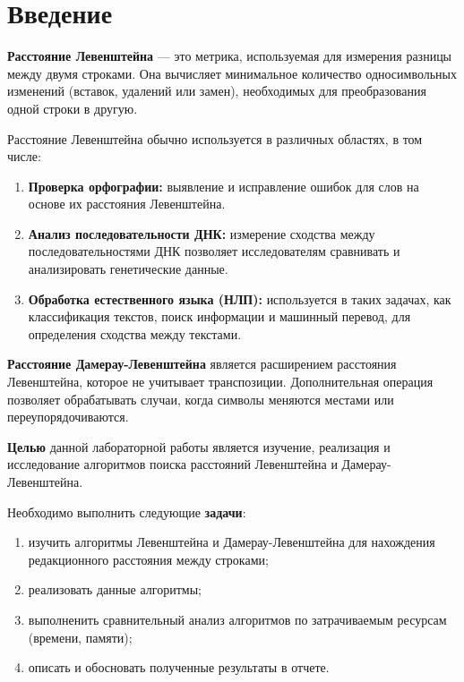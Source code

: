 \chapter*{Введение}

\textbf{Расстояние Левенштейна} — это метрика, используемая для измерения разницы между двумя строками. Она вычисляет минимальное количество односимвольных изменений (вставок, удалений или замен), необходимых для преобразования одной строки в другую.

Расстояние Левенштейна обычно используется в различных областях, в том числе:
\begin{enumerate}
    \item \textbf{Проверка орфографии:} выявление и исправление ошибок для слов на основе их расстояния Левенштейна.
    \item \textbf{Анализ последовательности ДНК:} измерение сходства между последовательностями ДНК позволяет исследователям сравнивать и анализировать генетические данные.
    \item \textbf{Обработка естественного языка (НЛП):} используется в таких задачах, как классификация текстов, поиск информации и машинный перевод, для определения сходства между текстами.
\end{enumerate}

\textbf{Расстояние Дамерау-Левенштейна} является расширением расстояния Левенштейна, которое не учитывает транспозиции. Дополнительная операция позволяет обрабатывать случаи, когда символы меняются местами или переупорядочиваются.

\textbf{Целью} данной лабораторной работы является изучение, реализация и исследование алгоритмов поиска расстояний Левенштейна и Дамерау-Левенштейна.

Необходимо выполнить следующие \textbf{задачи}:
\begin{enumerate}[label={\arabic*)}]
    \item изучить алгоритмы Левенштейна и Дамерау-Левенштейна для нахождения редакционного расстояния между строками;
    \item реализовать данные алгоритмы;
    \item выполненить сравнительный анализ алгоритмов по затрачиваемым ресурсам (времени, памяти);
    \item описать и обосновать полученные результаты в отчете.
\end{enumerate}